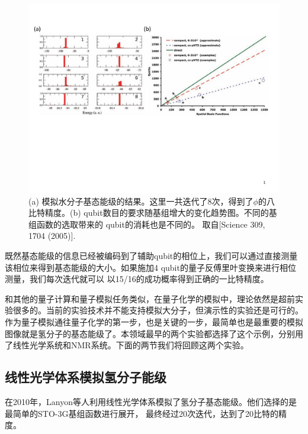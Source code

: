 \begin{figure}[htbp]
            \begin{center}
              \includegraphics[width= 0.8\columnwidth]{figures/moleculesim.pdf}
              \caption{(a) 模拟水分子基态能级的结果。这里一共迭代了8次，得到了$\phi$的八比特精度。(b) qubit数目的要求随基组增大的变化趋势图。不同的基组函数的选取带来的
              qubit的消耗也是不同的。
              取自[Science 309, 1704 (2005)\cite{Alan_first}]. }\label{moleculesim}
            \end{center}
 \end{figure}

既然基态能级的信息已经被编码到了辅助qubit的相位上，我们可以通过直接测量该相位来得到基态能级的大小。如果施加4 qubit的量子反傅里叶变换来进行相位测量，我们每次迭代就可以
以15/16的成功概率得到正确的一比特精度。

和其他的量子计算和量子模拟任务类似，在量子化学的模拟中，理论依然是超前实验很多的。当前的实验技术并不能支持模拟大分子，但演示性的实验还是可行的。
作为量子模拟通往量子化学的第一步，也是关键的一步，最简单也是最重要的模拟图像就是氢分子的基态能级了。本领域最早的两个实验都选择了这个示例，分别用了线性光学系统\cite{optics_static}和NMR系统\cite{static}。下面的两节我们将回顾这两个实验。

\subsection{线性光学体系模拟氢分子能级}

在2010年，Lanyon等人利用线性光学体系模拟了氢分子基态能级\cite{optics_static}。他们选择的是最简单的STO-3G基组函数进行展开，
最终经过20次迭代，达到了20比特的精度。

